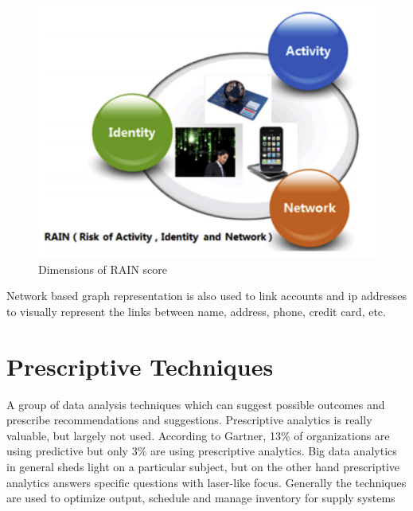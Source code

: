 \begin{figure}[H]
	\includegraphics[scale = 0.8]{figures/RAIN_dimension.png}
	\centering
	\caption{Dimensions of RAIN score}
	\label{fig:rain_dimension}
\end{figure}

Network based graph representation is also used to link accounts and ip addresses to visually represent the links between name, address, phone, credit card, etc.

\chapter{Prescriptive Techniques}
\label{prescriptive-techniques}

A group of data analysis techniques which can suggest possible outcomes and prescribe recommendations and suggestions.
Prescriptive analytics is really valuable, but largely not used. According to Gartner, 13\% of organizations are using predictive but only 3\% are using prescriptive analytics. 
Big data analytics in general sheds light on a particular subject, but on the other hand prescriptive analytics answers specific questions with laser-like focus. 
Generally the techniques are used to optimize output, schedule and manage inventory for supply systems

